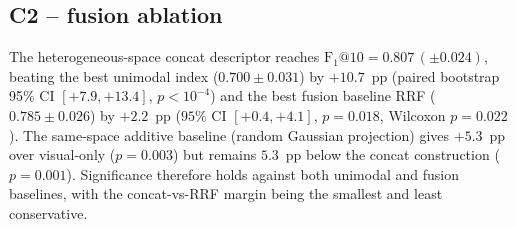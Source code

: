 ﻿\documentclass[conference]{IEEEtran}
\theoremstyle{definition}
\begin{document}
\subsection{C2 -- fusion ablation}
The heterogeneous-space concat descriptor reaches $\mathrm{F}_1@10=0.807\,(\pm0.024)$, beating the best unimodal index ($0.700\pm0.031$) by $+10.7$~pp (paired bootstrap 95\% CI $[+7.9,+13.4]$, $p<10^{-4}$) and the best fusion baseline RRF ($0.785\pm0.026$) by $+2.2$~pp ($95\%$ CI $[+0.4,+4.1]$, $p=0.018$, Wilcoxon $p=0.022$). The same-space additive baseline (random Gaussian projection) gives $+5.3$~pp over visual-only ($p=0.003$) but remains $5.3$~pp below the concat construction ($p=0.001$). Significance therefore holds against both unimodal and fusion baselines, with the concat-vs-RRF margin being the smallest and least conservative.
\end{document}
